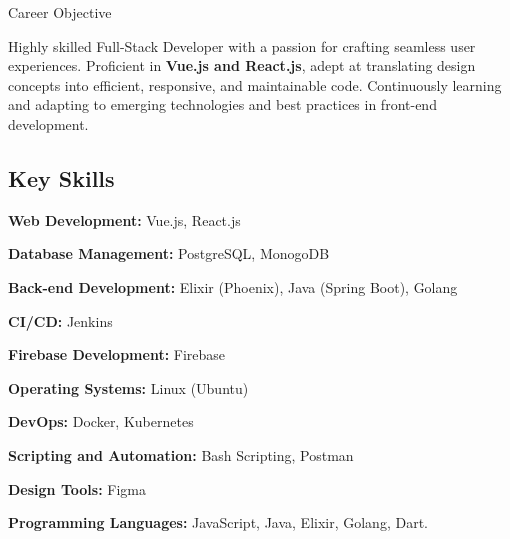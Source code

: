 \documentclass{resume} %
\begin{document}


\begin{rSection}{Career Objective}

    {Highly skilled Full-Stack Developer with a passion for crafting seamless user experiences. Proficient in \textbf{Vue.js and React.js}, adept at translating design concepts into efficient, responsive, and maintainable code. Continuously learning and adapting to emerging technologies and best practices in front-end development.}
    
\subsection*{Key Skills}

 \hspace{5mm} \textbf{Web Development:} Vue.js, React.js

 \hspace{5mm} \textbf{Database Management:} PostgreSQL, MonogoDB

 \hspace{5mm} \textbf{Back-end Development:} Elixir (Phoenix), Java (Spring Boot), Golang

 \hspace{5mm} \textbf{CI/CD:} Jenkins

 \hspace{5mm} \textbf{Firebase Development:} Firebase

 \hspace{5mm} \textbf{Operating Systems:} Linux (Ubuntu)

 \hspace{5mm} \textbf{DevOps:} Docker, Kubernetes

 \hspace{5mm} \textbf{Scripting and Automation:} Bash Scripting, Postman

 \hspace{5mm} \textbf{Design Tools:} Figma

 \hspace{5mm} \textbf{Programming Languages:} JavaScript, Java, Elixir, Golang, Dart.

\end{rSection}
\end{document}
